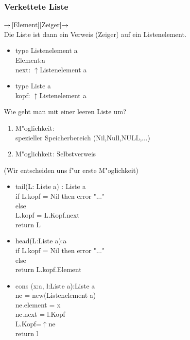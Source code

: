 \documentclass[a4paper]{scrartcl}
\begin{document}
\subsubsection*{Verkettete Liste}
$\rightarrow$[Element][Zeiger]$\rightarrow$\\
Die Liste ist dann ein Verweis (Zeiger) auf ein Listenelement.
\begin{itemize}

\item 
	type Listenelement a\\
	Element:a\\
	next: $\uparrow$Listenelement a\\
\item
	type Liste a\\
	kopf: $\uparrow$Listenelement a\\
\end{itemize}
	Wie geht man mit einer leeren Liste um?
	\begin{enumerate}
		\item M"oglichkeit: \\
			spezieller Speicherbereich (Nil,Null,NULL,...) 
		\item M"oglichkeit:  Selbstverweis 	
	\end{enumerate}
	(Wir entscheiden uns f"ur erste M"oglichkeit)
\begin{itemize}
\item
	tail(L: Liste a) : Liste a\\
		if L.kopf = Nil	then error "..."\\
		else \\
			L.kopf = L.Kopf.next\\
	return L\\
\item	
	head(L:Liste a):a\\
		if L.kopf = Nil then error "..."\\
		else \\
		return L.kopf.Element\\
		
\item
	cons (x:a, l:Liste a):Liste a\\
	ne = new(Listenelement a)\\
	ne.element = x\\
	ne.next = l.Kopf\\
	L.Kopf=$\uparrow$ne\\
	return l\\
	
\end{itemize}
\end{document}
